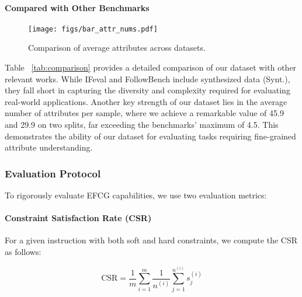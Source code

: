 \paragraph{Compared with Other Benchmarks}

\begin{figure}[t] 
    \centering
        \texttt{[image: figs/bar\_attr\_nums.pdf]}
    \caption{Comparison of average attributes across datasets.}
    \vspace{-1em}
    \label{fig:intro}
\end{figure}
Table ~\ref{tab:comparison} provides a detailed comparison of our dataset with other relevant works. 
While IFeval and FollowBench include synthesized data (Synt.), they fall short in capturing the diversity and complexity required for evaluating real-world applications.
Another key strength of our dataset lies in the average number of attributes per sample, where we achieve a remarkable value of 45.9 and 29.9 on two splits, far exceeding the benchmarks' maximum of 4.5. This demonstrates the ability of our dataset for evaluating tasks requiring fine-grained attribute understanding.


\subsubsection{Evaluation Protocol}
\label{sec:eval}
To rigorously evaluate EFCG capabilities, we use two evaluation metrics:

\paragraph{Constraint Satisfaction Rate (CSR)}

For a given instruction with both soft and hard constraints, we compute the CSR as follows:

$$
\mathrm{CSR}=\frac{1}{m} \sum_{i=1}^m \frac{1}{n^{(i)}} \sum_{j=1}^{n^{(i)}} s_j^{(i)}
$$

